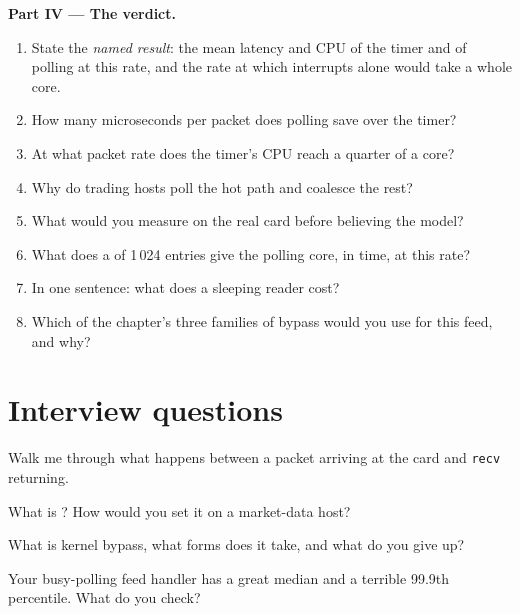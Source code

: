 \begin{problem}
\medskip\noindent\textbf{Part IV --- The verdict.}
\begin{enumerate}[resume]
\item State the \emph{named result}: the mean latency and CPU of the timer and of polling at this rate, and the rate at which interrupts
  alone would take a whole core.
\item How many microseconds per packet does polling save over the timer?
\item At what packet rate does the timer's CPU reach a quarter of a core?
\item Why do trading hosts poll the hot path and coalesce the rest?
\item What would you measure on the real card before believing the model?
\item What does a  of 1\,024 entries give the polling core, in time, at this rate?
\item In one sentence: what does a sleeping reader cost?
\item Which of the chapter's three families of bypass would you use for this feed, and why?
\end{enumerate}
\end{problem}

\section{Interview questions}

\begin{interviewq}\label{iq:nw:network-cards-and-kernel-bypass:1}
Walk me through what happens between a packet arriving at the card and \texttt{recv} returning.
\end{interviewq}

\begin{interviewq}\label{iq:nw:network-cards-and-kernel-bypass:2}
What is ? How would you set it on a market-data host?
\end{interviewq}

\begin{interviewq}\label{iq:nw:network-cards-and-kernel-bypass:3}
What is kernel bypass, what forms does it take, and what do you give up?
\end{interviewq}

\begin{interviewq}\label{iq:nw:network-cards-and-kernel-bypass:4}
Your busy-polling feed handler has a great median and a terrible 99.9th percentile. What do you check?
\end{interviewq}

